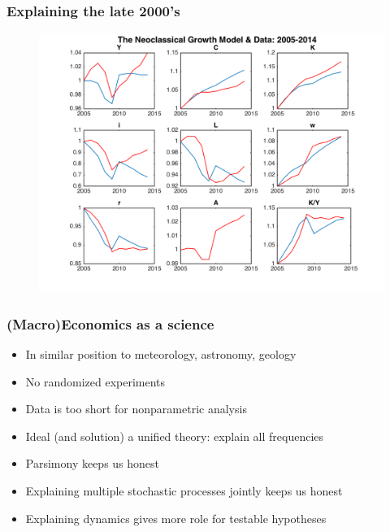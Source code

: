 \documentclass{beamer}
\begin{document}
\begin{frame}
\frametitle[alignment=center]{Explaining the late 2000's}
\begin{figure}
\centering
\includegraphics[scale=0.5]{Figure_9.png}
\end{figure}
\end{frame}


\begin{frame}
\frametitle[alignment=center]{(Macro)Economics as a science}
\begin{itemize}
\item In similar position to meteorology, astronomy, geology
\bigskip
\item No randomized experiments
\bigskip
\item Data is too short for nonparametric analysis
\bigskip
\item Ideal (and solution) a unified theory: explain all frequencies
\bigskip
\item Parsimony keeps us honest
\bigskip
\item Explaining multiple stochastic processes jointly keeps us honest
\bigskip
\item Explaining dynamics gives more role for testable hypotheses
\end{itemize}
\end{frame}
\end{document}
